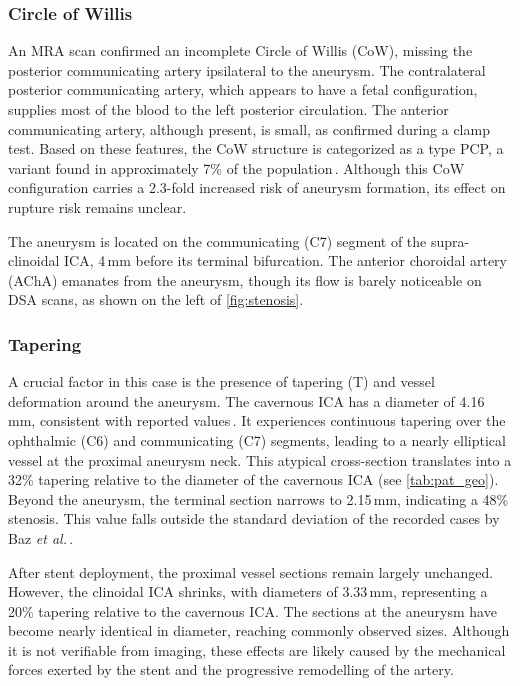 \subsubsection*{Circle of Willis}
An MRA scan confirmed an incomplete Circle of Willis (CoW), missing the posterior communicating artery ipsilateral to the aneurysm. The contralateral posterior communicating artery, which appears to have a fetal configuration, supplies most of the blood to the left posterior circulation. The anterior communicating artery, although present, is small, as confirmed during a clamp test. Based on these features, the CoW structure is categorized as a type PCP, a variant found in approximately 7\% of the population\,\cite{Hindenes2023}. Although this CoW configuration carries a 2.3-fold increased risk of aneurysm formation, its effect on rupture risk remains unclear.

The aneurysm is located on the communicating (C7) segment of the supra-clinoidal ICA, 4\,mm before its terminal bifurcation. The anterior choroidal artery (AChA) emanates from the aneurysm, though its flow is barely noticeable on DSA scans, as shown on the left of \autoref{fig:stenosis}.

\subsubsection*{Tapering}
A crucial factor in this case is the presence of tapering (T) and vessel deformation around the aneurysm. The cavernous ICA has a diameter of 4.16\,mm, consistent with reported values\,\cite{Baz2021}. It experiences continuous tapering over the ophthalmic (C6) and communicating (C7) segments, leading to a nearly elliptical vessel at the proximal aneurysm neck. This atypical cross-section translates into a 32\% tapering relative to the diameter of the cavernous ICA (see \autoref{tab:pat_geo}). Beyond the aneurysm, the terminal section narrows to 2.15\,mm, indicating a 48\% stenosis. This value falls outside the standard deviation of the recorded cases by Baz \textit{et al.}\,\cite{Baz2021}.

After stent deployment, the proximal vessel sections remain largely unchanged. However, the clinoidal ICA shrinks, with diameters of 3.33\,mm, representing a 20\% tapering relative to the cavernous ICA. The sections at the aneurysm have become nearly identical in diameter, reaching commonly observed sizes. Although it is not verifiable from imaging, these effects are likely caused by the mechanical forces exerted by the stent and the progressive remodelling of the artery.

